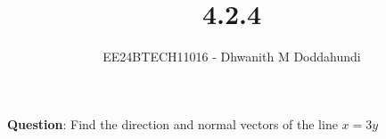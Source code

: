 \documentclass[journal]{IEEEtran}
\begin{document}

\vspace{3cm}

\title{4.2.4}
\author{EE24BTECH11016 - Dhwanith M Doddahundi}
{\let\newpage\relax\maketitle}

\renewcommand{\thefigure}{\theenumi}
\renewcommand{\thetable}{\theenumi}
\setlength{\intextsep}{10pt} %


\renewcommand{\thetable}{\theenumi}


\textbf{Question}:
Find the direction and normal vectors of the line $x=3y$
\end{document}
